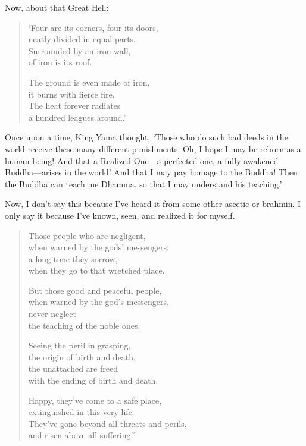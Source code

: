 \documentclass[12pt,openany]{book}%
\begin{document}
Now, about that Great Hell: 

\begin{verse}%
‘Four are its corners, four its doors, \\
neatly divided in equal parts. \\
Surrounded by an iron wall, \\
of iron is its roof. 

The ground is even made of iron, \\
it burns with fierce fire. \\
The heat forever radiates \\
a hundred leagues around.’ 

%
\end{verse}

Once upon a time, King Yama thought, ‘Those who do such bad deeds in the world receive these many different punishments. Oh, I hope I may be reborn as a human being! And that a Realized One—a perfected one, a fully awakened Buddha—arises in the world! And that I may pay homage to the Buddha! Then the Buddha can teach me Dhamma, so that I may understand his teaching.’ 

Now, I don’t say this because I’ve heard it from some other ascetic or brahmin. I only say it because I’ve known, seen, and realized it for myself. 

\begin{verse}%
Those people who are negligent, \\
when warned by the gods’ messengers: \\
a long time they sorrow, \\
when they go to that wretched place. 

But those good and peaceful people, \\
when warned by the god’s messengers, \\
never neglect \\
the teaching of the noble ones. 

Seeing the peril in grasping, \\
the origin of birth and death, \\
the unattached are freed \\
with the ending of birth and death. 

Happy, they’ve come to a safe place, \\
extinguished in this very life. \\
They’ve gone beyond all threats and perils, \\
and risen above all suffering.” 

%
\end{verse}
\end{document}

